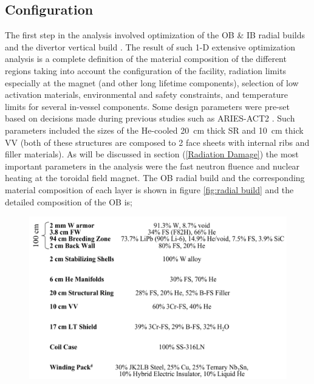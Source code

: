 \documentclass[12pt, letterpaper]{elsarticle}
\begin{document}
\subsection{Configuration} \label{Configuration}
The first step in the analysis involved optimization of the OB \& IB radial builds and the divertor vertical build \cite{ref_2}. The result of such 1-D extensive optimization analysis is a complete definition of the material composition of the different regions taking into account the configuration of the facility, radiation limits especially at the magnet (and other long lifetime components), selection of low activation materials, environmental and safety constraints, and temperature limits for several in-vessel components. Some design parameters were pre-set based on decisions made during previous studies such as ARIES-ACT2 \cite{ref_14}. Such parameters included the sizes of the He-cooled \SI{20}{cm} thick SR and \SI{10}{cm} thick VV (both of these structures are composed to 2 face sheets with internal ribs and filler materials). As will be discussed in section (\ref{Radiation Damage}) the most important parameters in the analysis were the fast neutron fluence and nuclear heating at the toroidal field magnet. The OB radial build and the corresponding material composition of each layer is shown in figure \ref{fig:radial build} and the detailed composition of the OB is;
\begin{figure}[h!]
  \centering
  \includegraphics[scale=0.2]{../plots/OB_comp.png}
  \label{fig:OB_comp}
\end{figure}
\end{document}
